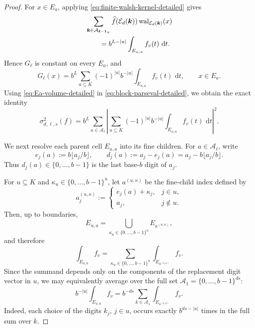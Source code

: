 \documentclass[10pt,a4paper]{amsart}
\newcommand{\E}{\mathcal E}
\newcommand{\dd}{\,\mathrm d}
\newcommand{\wal}{\operatorname{wal}}
\begin{document}
\begin{proof}
For $x\in E_a$, applying
\eqref{eq:finite-walsh-kernel-detailed} gives
\begin{align}
 &\sum_{\boldsymbol k\in
       \mathcal A_{\boldsymbol\ell-\boldsymbol1_u}}
 \widehat f(\E_d(\boldsymbol k))
 \wal_{\E_d(\boldsymbol k)}(x)
 \notag\\
 &\qquad
 =
 b^{L-|u|}
 \int_{E_{u,a}} f_v(t)\,\dd t.
 \label{eq:lower-projection-cell-detailed}
\end{align}
Hence $G_{\boldsymbol\ell}$ is constant on every $E_a$, and
\begin{equation}\label{eq:G-on-cell-detailed}
 G_{\boldsymbol\ell}(x)
 =
 b^L
 \sum_{u\subseteq K}
 (-1)^{|u|}b^{-|u|}
 \int_{E_{u,a}}f_v(t)\,\dd t,
 \qquad x\in E_a.
\end{equation}
Using \eqref{eq:Ea-volume-detailed} in
\eqref{eq:block-parseval-detailed}, we obtain the exact identity
\begin{equation}\label{eq:block-cell-exact-detailed}
 \sigma_{d,\boldsymbol\ell,s}^2(f)
 =
 b^L
 \sum_{a\in\mathcal A_{\boldsymbol\ell}}
 \left|
   \sum_{u\subseteq K}
   (-1)^{|u|}b^{-|u|}
   \int_{E_{u,a}}f_v(t)\,\dd t
 \right|^2.
\end{equation}

We next resolve each parent cell $E_{u,a}$ into its fine children.
For $a\in\mathcal A_{\boldsymbol\ell}$, write
\[
 e_j(a):=b\lfloor a_j/b\rfloor,
 \qquad
 d_j(a):=a_j-e_j(a)
        =a_j-b\lfloor a_j/b\rfloor.
\]
Thus $d_j(a)\in\{0,\ldots,b-1\}$ is the last base-$b$ digit
of $a_j$.

For $u\subseteq K$ and
$\kappa_u\in\{0,\ldots,b-1\}^{u}$, let
$a^{(u,\kappa)}$ be the fine-child index defined by
\[
 a^{(u,\kappa)}_j
 :=
 \begin{cases}
  e_j(a)+\kappa_j, & j\in u,\\
  a_j, & j\notin u.
 \end{cases}
\]
Then, up to boundaries,
\[
 E_{u,a}
 =
 \bigcup_{\kappa_u\in\{0,\ldots,b-1\}^{u}}
 E_{a^{(u,\kappa)}},
\]
and therefore
\begin{equation}\label{eq:parent-children-detailed}
 \int_{E_{u,a}}f_v
 =
 \sum_{\kappa_u\in\{0,\ldots,b-1\}^{u}}
 \int_{E_{a^{(u,\kappa)}}}f_v.
\end{equation}
Since the summand depends only on the components of the replacement
digit vector in $u$, we may equivalently average over the full set
$\mathcal A_1=\{0,\ldots,b-1\}^{ds}$:
\begin{equation}\label{eq:full-digit-average-detailed}
 b^{-|u|}
 \int_{E_{u,a}}f_v
 =
 b^{-ds}
 \sum_{k\in\mathcal A_1}
 \int_{E_{a^{(u,k)}}}f_v.
\end{equation}
Indeed, each choice of the digits $k_j$, $j\in u$, occurs exactly
$b^{ds-|u|}$ times in the full sum over $k$.


\end{proof}
\end{document}
